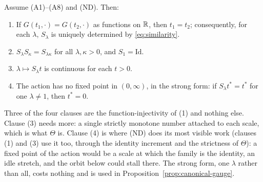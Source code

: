 \begin{lemma}\label{lem:action-rigidity}
Assume (A1)--(A8) and (ND). Then:
\begin{enumerate}
\item If $G(t_1,\cdot) = G(t_2,\cdot)$ as functions on $\mathbb{R}$, then $t_1 = t_2$; consequently,
for each $\lambda$, $S_\lambda$ is uniquely determined by \ref{eq:similarity}.
\item $S_\lambda S_\kappa = S_{\lambda\kappa}$ for all $\lambda,\kappa > 0$, and
$S_1 = \mathrm{Id}$.
\item $\lambda \mapsto S_\lambda t$ is continuous for each $t > 0$.
\item The action has no fixed point in $(0,\infty)$, in the strong form: if
$S_\lambda t^* = t^*$ for one $\lambda \ne 1$, then $t^* = 0$.
\end{enumerate}
\end{lemma}

Three of the four clauses are the function-injectivity of (1) and nothing else. Clause (3)
needs more: a single strictly monotone number attached
to each scale, which is what $\Theta$ is. Clause (4) is where (ND) does its most visible
work (clauses (1) and (3) use it too, through the identity increment and the strictness of
$\Theta$): a fixed point of the action would be a scale at which the family is the identity, an idle
stretch, and the orbit below could stall there. The strong form, one $\lambda$ rather than
all, costs nothing and is used in Proposition~\ref{prop:canonical-gauge}.

